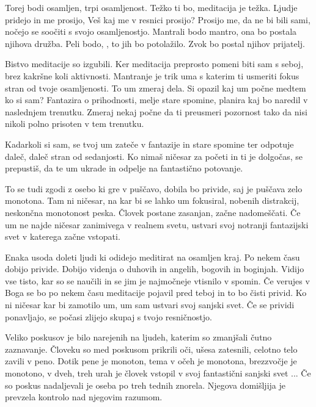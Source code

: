 Torej bodi osamljen, trpi osamljenost. Težko ti bo, meditacija je težka. Ljudje pridejo in me prosijo,  Veš kaj me v resnici prosijo? Prosijo me, da ne bi bili sami, nočejo se soočiti s svojo osamljenostjo. Mantrali bodo mantro, ona bo postala njihova družba. Peli bodo, , to jih bo potolažilo. Zvok  bo postal njihov prijatelj. 

Bistvo meditacije so izgubili. Ker meditacija preprosto pomeni biti sam s seboj, brez kakršne koli aktivnosti. Mantranje je trik uma s katerim ti usmeriti fokus stran od tvoje osamljenosti. To um zmeraj dela. Si opazil kaj um počne medtem ko si sam? Fantazira o prihodnosti, melje stare spomine, planira kaj bo naredil v naslednjem trenutku. Zmeraj nekaj počne da ti preusmeri pozornost tako da nisi nikoli polno prisoten v tem trenutku. 

Kadarkoli si sam, se tvoj um zateče v fantazije in stare spomine ter odpotuje daleč, daleč stran od sedanjosti. Ko nimaš ničesar za početi in ti je dolgočas, se prepustiš, da te um ukrade in odpelje na fantastično potovanje. 

To se tudi zgodi z osebo ki gre v puščavo, dobila bo privide, saj je puščava zelo monotona. Tam ni ničesar, na kar bi se lahko um fokusiral, nobenih distrakcij, neskončna monotonost peska. Človek postane zasanjan, začne nadomeščati. Če um ne najde ničesar zanimivega v realnem svetu, ustvari svoj notranji fantazijski svet v katerega začne vstopati. 

Enaka usoda doleti ljudi ki odidejo meditirat na osamljen kraj. Po nekem času dobijo privide. Dobijo videnja o duhovih in angelih, bogovih in boginjah. Vidijo vse tisto, kar so se naučili in se jim je najmočneje vtisnilo v spomin. Če verujes v Boga se bo po nekem času meditacije pojavil pred teboj in to bo čisti privid. Ko ni ničesar kar bi zamotilo um, um sam ustvari svoj sanjski svet. Če se prividi ponavljajo, se počasi zlijejo skupaj s tvojo resničnostjo. 

Veliko poskusov je bilo narejenih na ljudeh, katerim so zmanjšali čutno zaznavanje. Človeku so med poskusom prikrili oči, ušesa zatesnili, celotno telo zavili v peno. Dotik pene je monoton, tema v očeh je monotona, brezzvočje je monotono, v dveh, treh urah je človek vstopil v svoj fantastični sanjski svet ... Če so poskus nadaljevali je oseba po treh tednih znorela. Njegova domišljija je prevzela kontrolo nad njegovim razumom. 

